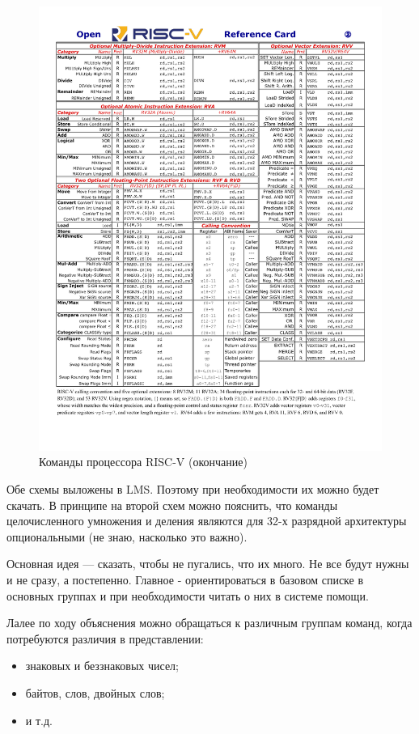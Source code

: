 \begin{figure}[htbp]
    \centering
    \includegraphics[width=1.0\textwidth]{img/riscv-reference-card-02.png}
    \caption{Команды процессора RISC-V (окончание)}
    \label{ref-riscv-commands-02}
\end{figure}

Обе схемы выложены в LMS. Поэтому при необходимости их можно будет скачать. В принципе на второй схем можно пояснить, что команды целочисленного умножения и деления являются для 32-х разрядной архитектуры опциональными (не знаю, насколько это важно).

Основная идея --- сказать, чтобы не пугались, что их много. Не все будут нужны и не сразу, а постепенно. Главное - ориентироваться в базовом списке в основных группах и при необходимости читать о них в системе помощи.

Лалее по ходу объяснения можно обращаться к различным группам команд, когда потребуются различия в представлении:
\begin{itemize}
    \item знаковых и беззнаковых чисел;
    \item байтов, слов, двойных слов;
    \item и т.д.
\end{itemize}

